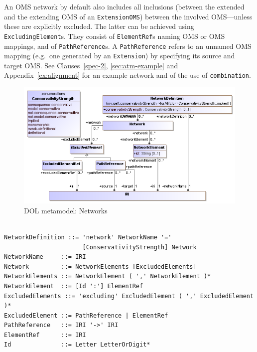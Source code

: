 \documentclass[10pt, a4paper]{isov2}
\newcommand*{\syntax}[1]{\texttt{#1}}
\begin{document}
An OMS network by default also includes all inclusions (between
the extended and the extending OMS of an \syntax{ExtensionOMS})
between the involved OMS---unless these are explicitly excluded.
The latter can be achieved using \syntax{ExcludingElement}s.
They consist of \syntax{ElementRef}s naming OMS or OMS mappings,
and of \syntax{PathReference}s. A \syntax{PathReference} refers
to an unnamed OMS mapping (e.g.\ one generated by an \syntax{Extension}) 
by specifying its source and target OMS. See Clauses~\ref{spec-2}, \ref{sec:atm-example}
and Appendix~\ref{ex:alignment} for an example network and of the use of \syntax{combination}.

\medskip
\begin{figure}
  \centering
    \includegraphics[scale=0.47]{mof/networks.png}
  \caption{DOL metamodel: Networks}
  \label{fig:networks}
\end{figure}




\vspace{-1.4em}
\begin{lstlisting}[language=ebnf,escapeinside={()},morecomment={[l]{\%\%\ }}]

NetworkDefinition ::= 'network' NetworkName '='
                      [ConservativityStrength] Network
NetworkName     ::= IRI
Network         ::= NetworkElements [ExcludedElements]
NetworkElements ::= NetworkElement ( ',' NetworkElement )*
NetworkElement  ::= [Id ':'] ElementRef
ExcludedElements ::= 'excluding' ExcludedElement ( ',' ExcludedElement )*
ExcludedElement ::= PathReference | ElementRef
PathReference   ::= IRI '->' IRI
ElementRef      ::= IRI
Id              ::= Letter LetterOrDigit*
\end{lstlisting}
\end{document}
